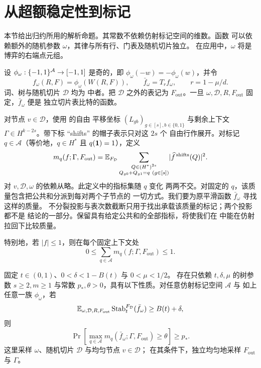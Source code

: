 \section{从超额稳定性到标记}\label{sec:extraction}

本节给出归约所用的解析命题。其常数不依赖仿射标记空间的维数。函数
可以依赖额外的随机参数 $\omega$，其律与所有行、门表及随机切片独立。
在应用中，$\omega$ 将是博弈的右端点元组。

设 $\phi_\omega:\{-1,1\}^{\mathcal A}\to[-1,1]$ 是奇的，即
$\phi_\omega(-w)=-\phi_\omega(w)$，并令
\[
 f_\omega(R,F)=\phi_\omega(W(R,F)),\qquad
 \bar f_\omega=T_r f_\omega,\qquad r=1-\mu/d.
\]
词、树与随机切片 $\mathcal D$ 均为  中者。把
$\mathcal D$ 之外的表记为 $F_{\mathrm{out}}$。一旦
$\omega,\mathcal D,R,F_{\mathrm{out}}$ 固定，$\bar f_\omega$ 便是
独立切片表比特的函数。

对节点 $v\in\mathcal D$，使用  的自由
平移坐标 $(L_{gb})_{g\in[s],b\in\{0,1\}}$ 与剩余上下文
$\Gamma\in H^{k-2s}$。带下标 ``shifts'' 的帽子表示只对这 $2s$ 个
自由行作展开。对标记 $q\in\mathcal A$（等价地，$q\in H^*$ 且
$q(\mathbf 1)=1$），定义
\begin{equation}\label{eq:mass}
 m_q(f;\Gamma,F_{\mathrm{out}})
 =\mathbb E_{F_{\mathcal D}}
 \sum_{\substack{Q\in(H^*)^{2s}\\
                  Q_{g0}+Q_{g1}=q\ (g\in[s])}}
 \lvert\widehat f^{\,\mathrm{shifts}}(Q)\rvert^2.
\end{equation}
对 $v,\mathcal D,\omega$ 的依赖从略。此定义中的指标集随 $q$ 变化
两两不交。对固定的 $q$，该质量包含把公共和分派到每对两个子节点的
一切方式。我们要为原平滑函数 $\bar f_\omega$ 寻找这样的质量。
不分裂投影与表次数截断只用于找出承载该质量的标记；两个投影都不是
结论的一部分。保留具有给定公共和的全部指标，将使我们在
 中能在仿射拉回下比较质量。

特别地，若 $|f|\le1$，则在每个固定上下文处
\begin{equation}\label{eq:mass-bound}
 0\le\sum_{q\in\mathcal A}m_q(f;\Gamma,F_{\mathrm{out}})\le1.
\end{equation}

\begin{proposition}[维数无关的抽取]\label{prop:extraction}
固定 $t\in(0,1)$、$0<\delta<1-B(t)$ 与 $0<\mu<1/2$。
存在只依赖 $t,\delta,\mu$ 的树参数 $s\ge2,m\ge1$ 与常数
$p_*,\theta>0$，具有以下性质。对任意仿射标记空间 $\mathcal A$ 与
如上任意一族 $\phi_\omega$，若
\begin{equation}\label{eq:excess-stability}
 \mathbb E_{\omega,\mathcal D,R,F_{\mathrm{out}}}
 \operatorname{Stab}_t^{F_{\mathcal D}}(\bar f_\omega)
 \ge B(t)+\delta,
\end{equation}
则
\begin{equation}\label{eq:extraction-event}
 \Pr\left[
   \max_{q\in\mathcal A}
   m_q(\bar f_\omega;\Gamma,F_{\mathrm{out}})\ge\theta
 \right]\ge p_*.
\end{equation}
这里采样 $\omega$、随机切片 $\mathcal D$ 与均匀节点 $v\in\mathcal D$；
在其条件下，独立均匀地采样 $F_{\mathrm{out}}$ 与 $\Gamma$。
\end{proposition}

